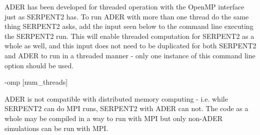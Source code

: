 ADER has been developed for threaded operation with the OpenMP interface just
as SERPENT2 has. To run ADER with more than one thread do the same thing
SERPENT2 asks, add the input seen below to the command line executing the
SERPENT2 run. This will enable threaded computation for SERPENT2 as a whole
as well, and this input does not need to be duplicated for both SERPENT2 and
ADER to run in a threaded manner - only one instance of this command line option
should be used.

\begin{lt}
-omp [num_threads]
\end{lt}

ADER is not compatible with distributed memory computing - i.e. while SERPENT2
can do MPI runs, SERPENT2 with ADER can not. The code as a whole may be
compiled in a way to run with MPI but only non-ADER simulations can be run with
MPI.
